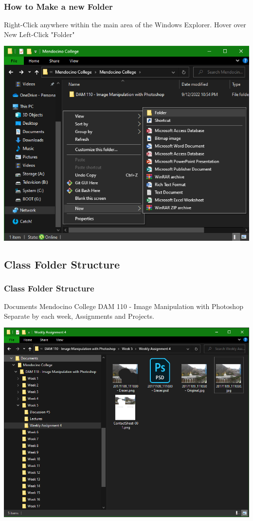 \documentclass{beamer}
\begin{document}
\begin{frame}
	\frametitle{How to Make a new Folder}
	
	\begin{outline}
		\1 Right-Click anywhere within the main area of the Windows Explorer.  
		\2 Hover over New
		\3 Left-Click "Folder"
	\end{outline}
	\begin{center}
		\includegraphics[width=.7\textwidth]{images/new folder.png}
	\end{center}
\end{frame}

\subsection{Class Folder Structure}	
\begin{frame}
		\frametitle{Class Folder Structure}

	\begin{outline}
		\1 Documents
		\2 Mendocino College
		\3 DAM 110 - Image Manipulation with Photoshop
		\3 Separate by each week, Assignments and Projects.
	\end{outline}
\begin{center}
	\includegraphics[width=.7\textwidth]{images/Class Folder Structure.png}
	\end{center}
\end{frame}
\end{document}
